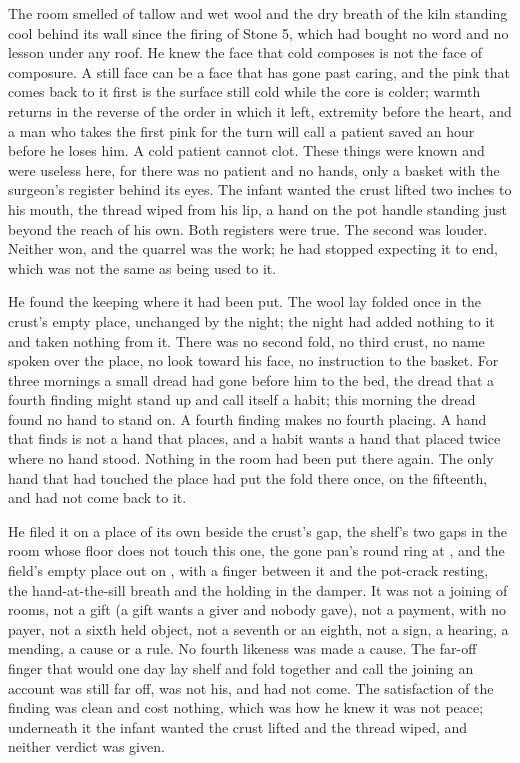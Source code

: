 The room smelled of tallow and wet wool and the dry breath of the kiln standing cool behind its wall since the firing of Stone 5, which had bought no word and no lesson under any roof. He knew the face that cold composes is not the face of composure. A still face can be a face that has gone past caring, and the pink that comes back to it first is the surface still cold while the core is colder; warmth returns in the reverse of the order in which it left, extremity before the heart, and a man who takes the first pink for the turn will call a patient saved an hour before he loses him. A cold patient cannot clot. These things were known and were useless here, for there was no patient and no hands, only a basket with the surgeon's register behind its eyes. The infant wanted the crust lifted two inches to his mouth, the thread wiped from his lip, a hand on the pot handle standing just beyond the reach of his own. Both registers were true. The second was louder. Neither won, and the quarrel was the work; he had stopped expecting it to end, which was not the same as being used to it.

He found the keeping where it had been put. The wool lay folded once in the crust's empty place, unchanged by the night; the night had added nothing to it and taken nothing from it. There was no second fold, no third crust, no name spoken over the place, no look toward his face, no instruction to the basket. For three mornings a small dread had gone before him to the bed, the dread that a fourth finding might stand up and call itself a habit; this morning the dread found no hand to stand on. A fourth finding makes no fourth placing. A hand that finds is not a hand that places, and a habit wants a hand that placed twice where no hand stood. Nothing in the room had been put there again. The only hand that had touched the place had put the fold there once, on the fifteenth, and had not come back to it.

He filed it on a place of its own beside the crust's gap, the shelf's two gaps in the room whose floor does not touch this one, the gone pan's round ring at , and the field's empty place out on , with a finger between it and the pot-crack resting, the hand-at-the-sill breath and the holding in the damper. It was not a joining of rooms, not a gift (a gift wants a giver and nobody gave), not a payment, with no payer, not a sixth held object, not a seventh or an eighth, not a sign, a hearing, a mending, a cause or a rule. No fourth likeness was made a cause. The far-off finger that would one day lay shelf and fold together and call the joining an account was still far off, was not his, and had not come. The satisfaction of the finding was clean and cost nothing, which was how he knew it was not peace; underneath it the infant wanted the crust lifted and the thread wiped, and neither verdict was given.

